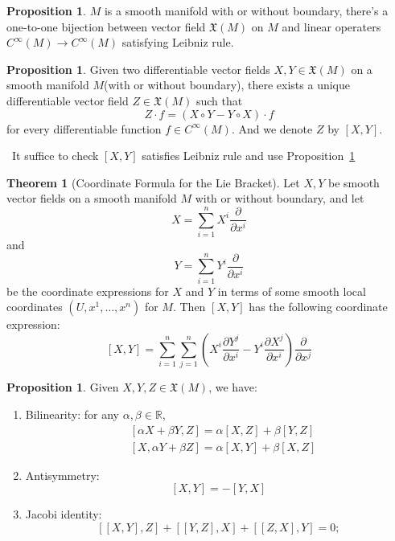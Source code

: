 \documentclass[12pt,a4paper]{book}
\newenvironment{prooff}{{\noindent\it\textcolor{cyan!40!black}{Proof}:}\,}{\par}
\newenvironment{enu}{\begin{enumerate}[(1)]}{\end{enumerate}}
\theoremstyle{definition}
\newtheorem{theo}[defn]{Theorem}
\newtheorem{prop}[defn]{Proposition}
\begin{document}
\begin{prop}
    $M$ is a smooth manifold with or without boundary, there's a one-to-one bijection between
    vector field $\mathfrak{X}(M)$ on $M$ and linear operaters $C^{\infty}(M)\rightarrow C^{\infty}(M)$ satisfying Leibniz rule.
    \label{correspondence:vector field and Der}
\end{prop}
\begin{prop}
    Given two differentiable vector fields $X, Y \in \mathfrak{X}(M)$ on a smooth manifold $M$(with or without boundary), there exists a unique differentiable vector field $Z \in \mathfrak{X}(M)$ such that
    $$
        Z \cdot f=(X \circ Y-Y \circ X) \cdot f
    $$
    for every differentiable function $f \in C^{\infty}(M)$. And we denote $Z$ by $[X,Y]$.
\end{prop}
\begin{prooff}
    It suffice to check $[X,Y]$ satisfies Leibniz rule and use Proposition~\ref{correspondence:vector field and Der}
\end{prooff}
\begin{theo}[Coordinate Formula for the Lie Bracket]
    Let $X, Y$ be smooth vector fields on a smooth manifold $M$ with or without boundary, and let
    $$
        X=\sum_{i=1}^nX^i \frac{\partial}{\partial x^i}
    $$
    and
    $$
        Y=\sum_{i=1}^nY^i \frac{\partial}{\partial x^i}
    $$
    be the coordinate expressions for $X$ and $Y$ in terms of some smooth local coordinates $\left(U,x^1,\dots,x^n\right)$ for $M$. Then $[X, Y]$ has the following coordinate expression:
    $$
        [X, Y]=\sum_{i=1}^n\sum_{j=1}^n\left(X^i \frac{\partial Y^j}{\partial x^i}-Y^i \frac{\partial X^j}{\partial x^i}\right) \frac{\partial}{\partial x^j}
    $$
\end{theo}
\begin{prop}
    Given $X, Y, Z \in \mathfrak{X}(M)$, we have:
    \begin{enu}
        \item Bilinearity: for any $\alpha, \beta \in \mathbb{R}$,
        $$
            \begin{aligned}
                 & {[\alpha X+\beta Y, Z]=\alpha[X, Z]+\beta[Y, Z]} \\
                 & {[X, \alpha Y+\beta Z]=\alpha[X, Y]+\beta[X, Z]}
            \end{aligned}
        $$
        \item Antisymmetry:
        $$
            [X, Y]=-[Y, X]
        $$
        \item Jacobi identity:
        $$
            [[X, Y], Z]+[[Y, Z], X]+[[Z, X], Y]=0 ;
        $$
    \end{enu}
\end{prop}
\end{document}
